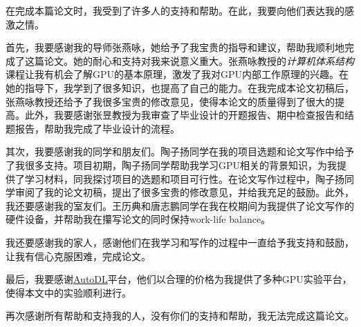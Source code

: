 
\begin{acknowledgements}

在完成本篇论文时，我受到了许多人的支持和帮助。在此，我要向他们表达我的感激之情。

首先，我要感谢我的导师张燕咏，她给予了我宝贵的指导和建议，帮助我顺利地完成了这篇论文。她的耐心和支持对我来说意义重大。张燕咏教授的\emph{计算机体系结构}课程让我有机会了解GPU的基本原理，激发了我对GPU内部工作原理的兴趣。在她的指导下，我学到了很多知识，也提高了自己的能力。在我完成本论文初稿后，张燕咏教授还给予了我很多宝贵的修改意见，使得本论文的质量得到了很大的提高。此外，我要感谢张昱教授为我审查了毕业设计的开题报告、期中检查报告和结题报告，帮助我完成了毕业设计的流程。

其次，我要感谢我的同学和朋友们。陶子扬同学在我的项目选题和论文写作中给予了我很多支持。项目初期，陶子扬同学帮助我学习GPU相关的背景知识，为我提供了学习材料，同我探讨项目的选题和项目可行性。在论文写作过程中，陶子扬同学审阅了我的论文初稿，提出了很多宝贵的修改意见，并给我充足的鼓励。此外，我还要感谢我的室友们。王历典和唐志鹏同学在我在校期间为我提供了论文写作的硬件设备，并帮助我在攥写论文的同时保持work-life balance。

我还要感谢我的家人，感谢他们在我学习和写作的过程中一直给予我支持和鼓励，让我有信心克服困难，完成论文。

最后，我要感谢\href{https://www.autodl.com/home}{AutoDL}平台，他们以合理的价格为我提供了多种GPU实验平台，使得本文中的实验顺利进行。

再次感谢所有帮助和支持我的人，没有你们的支持和帮助，我无法完成这篇论文。

\end{acknowledgements}
